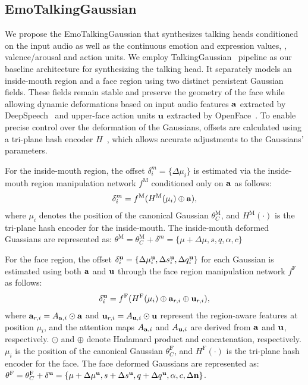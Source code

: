 \subsection{EmoTalkingGaussian} 
We propose the EmoTalkingGaussian that synthesizes talking heads conditioned on the input audio as well as the continuous emotion and expression values, \ie, valence/arousal and action units. We employ TalkingGaussian~\cite{li2024talkinggaussian} pipeline as our baseline architecture for synthesizing the talking head. It separately models an inside-mouth region and a face region using two distinct persistent Gaussian fields. These fields remain stable and preserve the geometry of the face while allowing dynamic deformations based on input audio features $\mathbf{a}$ extracted by DeepSpeech~\cite{hannun2014deep} and upper-face action units $\mathbf{u}$ extracted by OpenFace~\cite{Baltrusaitis2018openface}. To enable precise control over the deformation of the Gaussians, offsets are calculated using a tri-plane hash encoder $H$~\cite{li2023efficient}, which allows accurate adjustments to the Gaussians' parameters.

For the inside-mouth region, the offset $\delta^m_i=\{ \Delta \mu_i \}$ is estimated via the inside-mouth region manipulation network $f^\text{M}$ conditioned only on $\mathbf{a}$ as follows:
\begin{eqnarray}
    \delta^m_i = f^\text{M}(H^\text{M}(\mu_i) \oplus \mathbf{a}), 
    \label{eq:mouth mlp}
\end{eqnarray}
where $\mu_i$ denotes the position of the canonical Gaussian $\theta^\text{M}_C$, and $H^\text{M}(\cdot)$ is the tri-plane hash encoder for the inside-mouth. The inside-mouth deformed Guassians are represented as: $\theta^\text{M}=\theta^\text{M}_C+\delta^m=\{\mu+\Delta \mu, s, q, \alpha, c\}$

For the face region, the offset $\delta^{\mathbf{u}}_i=\{\Delta \mu^{\mathbf{u}}_i,\Delta s^{\mathbf{u}}_i, \Delta q^{\mathbf{u}}_i \}$ for each Gaussian is estimated using both $\mathbf{a}$ and $\mathbf{u}$ through the face region manipulation network $f^\text{F}$ as follows:
\begin{eqnarray}
    \delta^{\mathbf{u}}_i = f^\text{F}(H^\text{F}(\mu_i) \oplus \mathbf{a}_{r,i} \oplus \mathbf{u}_{r,i}),
    \label{eq:face mlp}
\end{eqnarray}
where $\mathbf{a}_{r,i}=A_{\mathbf{a},i} \odot \mathbf{a}$ and $\mathbf{u}_{r,i}=A_{\mathbf{u},i} \odot \mathbf{u}$ represent the region-aware features at position $\mu_i$, and the attention maps $A_{\mathbf{a}, i}$ and $A_{\mathbf{u}, i}$ are derived from $\mathbf{a}$ and $\mathbf{u}$, respectively. $\odot$ and $\oplus$ denote Hadamard product and concatenation, respectively. $\mu_i$ is the position of the canonical Gaussian $\theta^\textbf{F}_C$, and $H^\text{F}(\cdot)$ is the tri-plane hash encoder for the face. The face deformed Gaussians are represented as: $\theta^\text{F}=\theta^\text{F}_C + \delta^{\mathbf{u}}=\{\mu+\Delta \mu^{\mathbf{u}}, s+\Delta s^{\mathbf{u}}, q+\Delta q^{\mathbf{u}}, \alpha, c, \Delta \mathbf{n} \}$.

